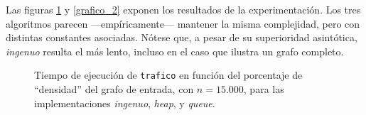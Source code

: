 Las figuras \ref{grafico_1} y \ref{grafico_2} exponen los resultados de la experimentación. Los tres algoritmos parecen ---empíricamente--- mantener la misma complejidad, pero con distintas constantes asociadas. Nótese que, a pesar de su superioridad asintótica, \textit{ingenuo} resulta el más lento, incluso en el caso que ilustra un grafo completo. %

\begin{figure}[!htbp]

    \caption{Tiempo de ejecución de \texttt{trafico} en función del porcentaje de ``densidad'' del grafo de entrada, con $n = 15.000$, para las implementaciones \textit{ingenuo}, \textit{heap}, y \textit{queue}.}
    \label{grafico_1}


\end{figure}
